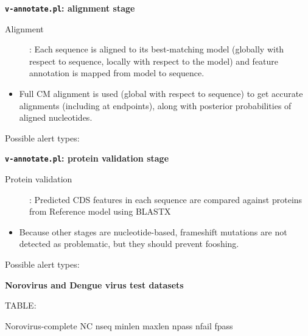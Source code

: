 \documentclass[landscape]{slides}
\begin{document}
\begin{slide}
\begin{center}
\textbf{\texttt{v-annotate.pl}: alignment stage}
\end{center}

\begin{description}
\item[Alignment]: Each sequence is aligned to its best-matching
  model (globally with respect to sequence, locally with respect to
  the model) and feature annotation is mapped from model to sequence.
\end{description}

\begin{itemize} 
\item Full CM alignment is used (global with respect to sequence) to get
  accurate alignments (including at endpoints), along with posterior
  probabilities of aligned nucleotides.
\end{itemize}

Possible alert types:

\vfill
\end{slide}
\begin{slide}
\begin{center}
\textbf{\texttt{v-annotate.pl}: protein validation stage}
\end{center}

\begin{description}
\item[Protein validation]: Predicted CDS features in each sequence are
  compared against proteins from Reference model using BLASTX
\end{description}

\begin{itemize} 
\item Because other stages are nucleotide-based, frameshift mutations
  are not detected as problematic, but they should prevent fooshing.
\end{itemize}

Possible alert types:

\vfill
\end{slide}
\begin{slide}
\begin{center}
\textbf{Norovirus and Dengue virus test datasets}
\end{center}

TABLE:

Norovirus-complete NC nseq minlen maxlen npass nfail fpass

\vfill
\end{slide}
\end{document}
